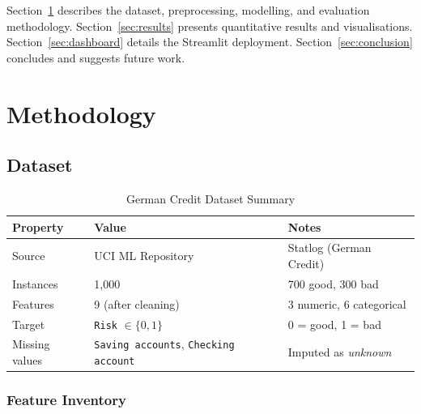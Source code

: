 \documentclass[12pt,a4paper]{article}
\theoremstyle{definition}
\newcommand{\code}[1]{\texttt{#1}}
\begin{document}
Section~\ref{sec:method} describes the dataset, preprocessing, modelling, and
evaluation methodology.  Section~\ref{sec:results} presents quantitative results
and visualisations.  Section~\ref{sec:dashboard} details the Streamlit
deployment.  Section~\ref{sec:conclusion} concludes and suggests future work.

\newpage

\section{Methodology}
\label{sec:method}

\subsection{Dataset}

\begin{table}[H]
  \centering
  \caption{German Credit Dataset Summary}
  \label{tab:dataset}
  \begin{tabularx}{\linewidth}{llX}
    \toprule
    \textbf{Property} & \textbf{Value} & \textbf{Notes} \\
    \midrule
    Source        & UCI ML Repository \cite{dua2019}  & Statlog (German Credit) \\
    Instances     & 1{,}000                           & 700 good, 300 bad       \\
    Features      & 9 (after cleaning)                & 3 numeric, 6 categorical \\
    Target        & \code{Risk} $\in \{0,1\}$         & 0 = good, 1 = bad        \\
    Missing values & \code{Saving accounts},
                     \code{Checking account}          & Imputed as \emph{unknown}\\
    \bottomrule
  \end{tabularx}
\end{table}

\subsubsection{Feature Inventory}
\end{document}
